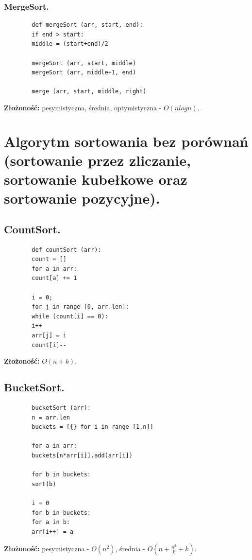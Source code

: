 \documentclass[12pt]{article}
\begin{document}
    \subsubsection{MergeSort.}

    \begin{verbatim}
        def mergeSort (arr, start, end):
        if end > start:
        middle = (start+end)/2

        mergeSort (arr, start, middle)
        mergeSort (arr, middle+1, end)

        merge (arr, start, middle, right)
    \end{verbatim}
    \textbf{Złożoność:} pesymistyczna, średnia, optymistyczna - $O(nlogn)$.

    \newpage

    \section{Algorytm sortowania bez porównań (sortowanie przez zliczanie, sortowanie kubełkowe oraz sortowanie pozycyjne).}

    \subsection{CountSort.}
    \begin{verbatim}
        def countSort (arr):
        count = []
        for a in arr:
        count[a] += 1

        i = 0;
        for j in range [0, arr.len]:
        while (count[i] == 0):
        i++
        arr[j] = i
        count[i]--
    \end{verbatim}
    \textbf{Złożoność:} $O(n+k)$.

    \subsection{BucketSort.}
    \begin{verbatim}
        bucketSort (arr):
        n = arr.len
        buckets = [{} for i in range [1,n]]

        for a in arr:
        buckets[n*arr[i]].add(arr[i])

        for b in buckets:
        sort(b)

        i = 0
        for b in buckets:
        for a in b:
        arr[i++] = a
    \end{verbatim}
    \textbf{Złożoność:} pesymistyczna -  $O(n^2)$, średnia - $O(n + \frac{n^2}{k} + k)$.
\end{document}
